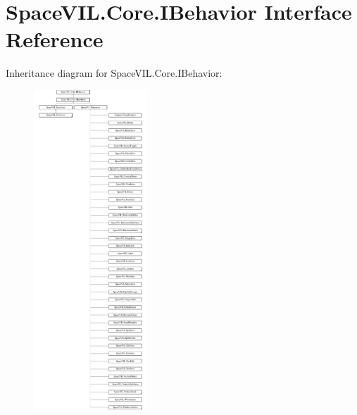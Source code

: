 \hypertarget{interface_space_v_i_l_1_1_core_1_1_i_behavior}{}\section{Space\+V\+I\+L.\+Core.\+I\+Behavior Interface Reference}
\label{interface_space_v_i_l_1_1_core_1_1_i_behavior}
Inheritance diagram for Space\+V\+I\+L.\+Core.\+I\+Behavior\+:\begin{figure}[H]
\begin{center}
\leavevmode
\includegraphics[height=12.000000cm]{interface_space_v_i_l_1_1_core_1_1_i_behavior}
\end{center}
\end{figure}
